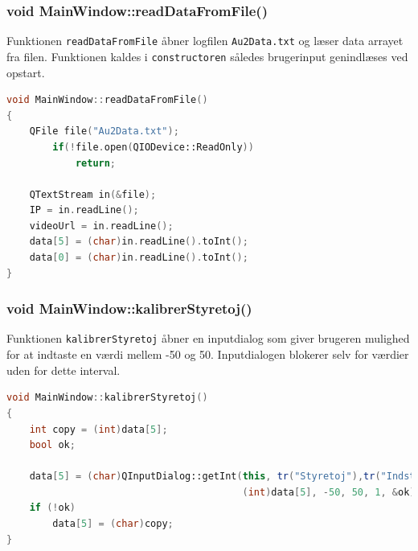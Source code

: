 \subsubsection{void MainWindow::readDataFromFile()}
Funktionen \texttt{readDataFromFile} åbner logfilen \texttt{Au2Data.txt} og læser data arrayet fra filen. Funktionen kaldes i \texttt{constructoren} således brugerinput genindlæses ved opstart. 
\begin{lstlisting}[caption={readDataFromFile},label=lst:readDataFromFile, language=c++]
void MainWindow::readDataFromFile()
{
    QFile file("Au2Data.txt");
        if(!file.open(QIODevice::ReadOnly))
            return;

    QTextStream in(&file);
    IP = in.readLine();
    videoUrl = in.readLine();
    data[5] = (char)in.readLine().toInt();
    data[0] = (char)in.readLine().toInt();
}
\end{lstlisting}

\subsubsection{void MainWindow::kalibrerStyretoj()}
Funktionen \texttt{kalibrerStyretoj} åbner en inputdialog som giver brugeren mulighed for at indtaste en værdi mellem -50 og 50. Inputdialogen blokerer selv for værdier uden for dette interval.
\begin{lstlisting}[caption={kalibrerStyretoj},label=lst:kalibrerStyretoj, language=c++]
void MainWindow::kalibrerStyretoj()
{
    int copy = (int)data[5];
    bool ok;

    data[5] = (char)QInputDialog::getInt(this, tr("Styretoj"),tr("Indstil styretoj"),
                                         (int)data[5], -50, 50, 1, &ok);
    if (!ok)
        data[5] = (char)copy;
}
\end{lstlisting}

